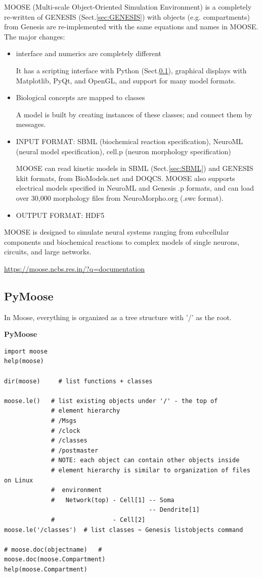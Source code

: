 MOOSE (Multi-scale Object-Oriented Simulation Environment) is 
a completely re-written of GENESIS (Sect.\ref{sec:GENESIS}) with objects (e.g.
compartments) from Genesis are re-implemented with the same equations and names
in MOOSE. The major changes:
\begin{itemize}
  \item interface and numerics are completely different
  
It has a scripting interface with Python (Sect.\ref{sec:PyMoose}), graphical
displays with Matplotlib, PyQt, and OpenGL, and support for many model formats. 
  

  \item Biological concepts are mapped to classes
  
  A model is built by creating instances of these classes; and connect them by
  messages. 
  
  \item INPUT FORMAT: SBML (biochemical reaction specification), NeuroML
  (neural model specification), cell.p (neuron morphology specification)

MOOSE can read kinetic models in SBML (Sect.\ref{sec:SBML}) and GENESIS kkit
formats, from BioModels.net and DOQCS. MOOSE also supports electrical models specified in
NeuroML and Genesis .p formats, and can load over 30,000 morphology files from
NeuroMorpho.org (.swc format).

   \item OUTPUT FORMAT: HDF5
   
   
\end{itemize}

MOOSE is designed to simulate neural systems ranging from subcellular components
and biochemical reactions to complex models of single neurons, circuits, and
large networks.


\url{https://moose.ncbs.res.in/?q=documentation}

\subsection{PyMoose}
\label{sec:PyMoose}

In Moose, everything is organized as a tree structure with '/' as the root.

{\bf PyMoose}
\begin{verbatim}
import moose
help(moose)

dir(moose)     # list functions + classes

moose.le()   # list existing objects under '/' - the top of 
             # element hierarchy
             # /Msgs
             # /clock
             # /classes
             # /postmaster
             # NOTE: each object can contain other objects inside
             # element hierarchy is similar to organization of files on Linux 
             #  environment 
             #   Network(top) - Cell[1] -- Soma
                                        -- Dendrite[1]
             #                - Cell[2]
moose.le('/classes')  # list classes ~ Genesis listobjects command

# moose.doc(objectname)   #
moose.doc(moose.Compartment)
help(moose.Compartment) 
\end{verbatim}

